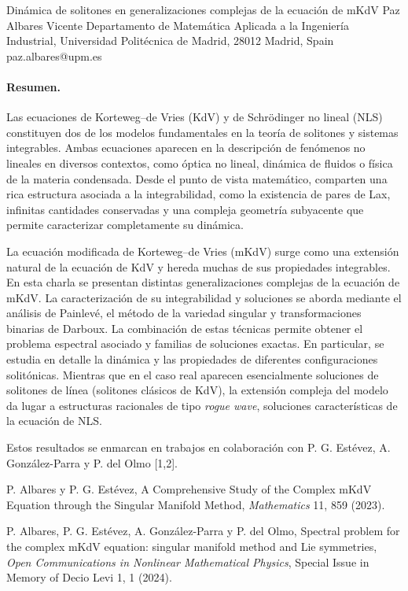 \documentclass[11pt,a4paper]{article}
\begin{document}
\begin{sincabstract}
{Dinámica de solitones en generalizaciones complejas de la ecuación de mKdV}
{Paz Albares Vicente}
{Departamento de Matemática Aplicada a la Ingeniería Industrial, Universidad Politécnica de Madrid, 28012 Madrid, Spain}
{paz.albares@upm.es}

\paragraph{Resumen.}
Las ecuaciones de Korteweg--de Vries (KdV) y de Schrödinger no lineal (NLS) constituyen dos de los modelos fundamentales en la teoría de solitones y sistemas integrables. Ambas ecuaciones aparecen en la descripción de fenómenos no lineales en diversos contextos, como óptica no lineal, dinámica de fluidos o física de la materia condensada. Desde el punto de vista matemático, comparten una rica estructura asociada a la integrabilidad, como la existencia de pares de Lax, infinitas cantidades conservadas y una compleja geometría subyacente que permite caracterizar completamente su dinámica.

La ecuación modificada de Korteweg--de Vries (mKdV) surge como una extensión natural de la ecuación de KdV y hereda muchas de sus propiedades integrables. En esta charla se presentan distintas generalizaciones complejas de la ecuación de mKdV. La caracterización de su integrabilidad y soluciones se aborda mediante el análisis de Painlevé, el método de la variedad singular y transformaciones binarias de Darboux. La combinación de estas técnicas permite obtener el problema espectral asociado y familias de soluciones exactas. En particular, se estudia en detalle la dinámica y las propiedades de diferentes configuraciones solitónicas. Mientras que en el caso real aparecen esencialmente soluciones de solitones de línea (solitones clásicos de KdV), la extensión compleja del modelo da lugar a estructuras racionales de tipo \textit{rogue wave}, soluciones características de la ecuación de NLS.

Estos resultados se enmarcan en trabajos en colaboración con P. G. Estévez, A. González-Parra y P. del Olmo [1,2].


\begin{enumerate}[label={[\arabic*]},leftmargin=*]
\item P. Albares y P. G. Estévez, A Comprehensive Study of the Complex mKdV Equation through the Singular Manifold Method, \textit{Mathematics} 11, 859 (2023).
\item P. Albares, P. G. Estévez, A. González-Parra y P. del Olmo, Spectral problem for the complex mKdV equation: singular manifold method and Lie symmetries, \textit{Open Communications in Nonlinear Mathematical Physics}, Special Issue in Memory of Decio Levi 1, 1 (2024).
\end{enumerate}
\end{sincabstract}
\end{document}
